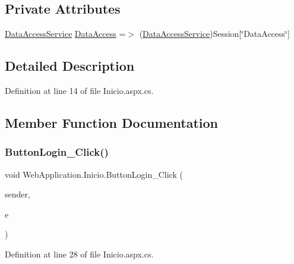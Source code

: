 \subsection*{Private Attributes}
\begin{DoxyCompactItemize}
\item 
\mbox{\hyperlink{classDataBaseAccess_1_1DataAccessService}{Data\+Access\+Service}} \mbox{\hyperlink{classWebApplication_1_1Inicio_af08ee9b91d0d180dfe4778c6da094365}{Data\+Access}} =$>$ (\mbox{\hyperlink{classDataBaseAccess_1_1DataAccessService}{Data\+Access\+Service}})Session\mbox{[}\char`\"{}Data\+Access\char`\"{}\mbox{]}
\end{DoxyCompactItemize}


\subsection{Detailed Description}


Definition at line 14 of file Inicio.\+aspx.\+cs.



\subsection{Member Function Documentation}
\mbox{\label{classWebApplication_1_1Inicio_ae7a3d9491d82443eb3e3841c78221e54}} 
\subsubsection{\texorpdfstring{ButtonLogin\_Click()}{ButtonLogin\_Click()}}
{\footnotesize\ttfamily void Web\+Application.\+Inicio.\+Button\+Login\+\_\+\+Click (\begin{DoxyParamCaption}\item[{object}]{sender,  }\item[{Event\+Args}]{e }\end{DoxyParamCaption})\hspace{0.3cm}{\ttfamily [protected]}}



Definition at line 28 of file Inicio.\+aspx.\+cs.

\mbox{\label{classWebApplication_1_1Inicio_a49ed6b3fca4c9a9ab9487df6ac627716}} 
